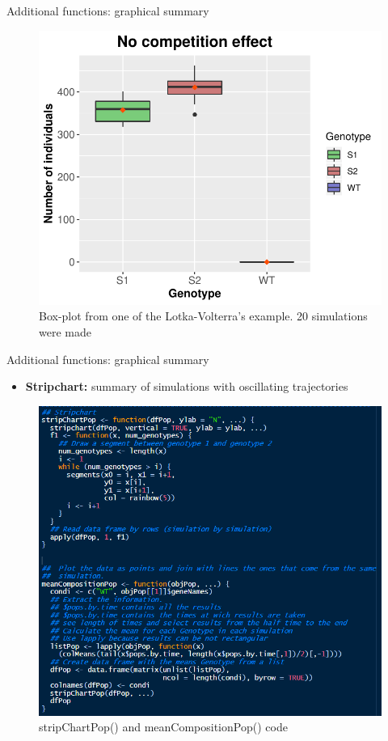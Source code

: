 \begin{frame}{Additional functions: graphical summary}
    \begin{figure}
    \centering
    \includegraphics[width=0.65\linewidth]{img/boxplot_example.pdf}
    \caption{Box-plot from one of the Lotka-Volterra's example. 20 simulations were made}
    \end{figure}
\end{frame}

\begin{frame}{Additional functions: graphical summary}
    \begin{itemize}
    \item \textbf{Stripchart:} summary of simulations with oscillating trajectories
     \end{itemize}
     \begin{figure}
        \centering
        \includegraphics[width=0.6\linewidth]{img/stripchart_code.PNG}
        \caption{stripChartPop() and meanCompositionPop() code}
    \end{figure}
\end{frame}

